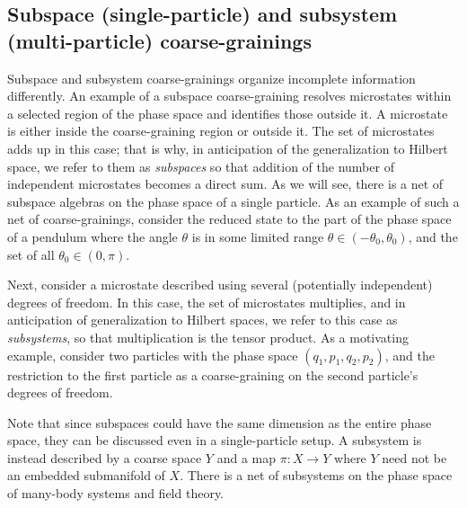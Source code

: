 \documentclass[a4paper,11pt]{article}
\theoremstyle{definition}
\begin{document}
\subsection{Subspace (single-particle) and subsystem (multi-particle) coarse-grainings}
\label{subsec:classical-region-subsystem}

Subspace and subsystem coarse-grainings organize incomplete information differently. An example of a subspace coarse-graining resolves microstates within a selected region of the phase space and identifies those outside it. A microstate is either inside the coarse-graining region or outside it. The set of microstates adds up in this case; that is why, in anticipation of the generalization to Hilbert space, we refer to them as {\it subspaces} so that addition of the number of independent microstates becomes a direct sum. As we will see, there is a net of subspace algebras on the phase space of a single particle. As an example of such a net of coarse-grainings, consider the reduced state to the part of the phase space of a pendulum where the angle $\theta$ is in some limited range $\theta\in (-\theta_0,\theta_0)$, and the set of all $\theta_0\in (0,\pi)$.

Next, consider a microstate described using several (potentially independent) degrees of freedom. In this case, the set of microstates multiplies, and in anticipation of generalization to Hilbert spaces, we refer to this case as {\it subsystems}, so that multiplication is the tensor product. As a motivating example, consider two particles with the phase space $(q_1,p_1,q_2,p_2)$, and the restriction to the first particle as a coarse-graining on the second particle's degrees of freedom.

Note that since subspaces could have the same dimension as the entire phase space, they can be discussed even in a single-particle setup. A subsystem is instead described by a coarse space $Y$ and a map $\pi: X\to Y$ where $Y$ need not be an embedded submanifold of $X$. There is a net of subsystems on the phase space of many-body systems and field theory.
\end{document}
